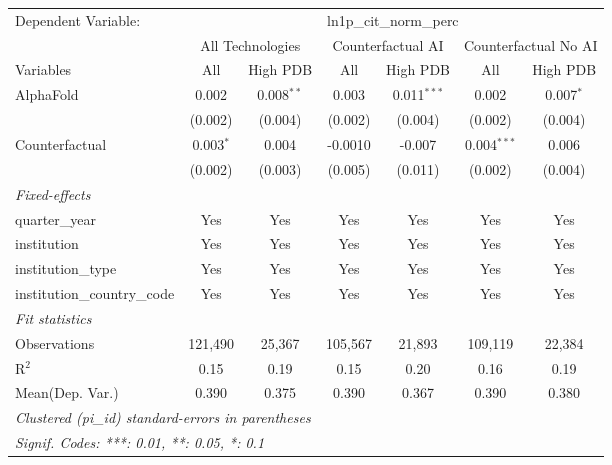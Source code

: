 \begingroup
\centering
\begin{tabular}{lcccccc}
   \tabularnewline \midrule \midrule
   Dependent Variable: & \multicolumn{6}{c}{ln1p\_cit\_norm\_perc}\\
 & \multicolumn{2}{c}{All Technologies} & \multicolumn{2}{c}{Counterfactual AI} & \multicolumn{2}{c}{Counterfactual No AI} \\
\cmidrule(lr){1-1}\cmidrule(lr){2-3} \cmidrule(lr){4-5} \cmidrule(lr){6-7}
Variables & \multicolumn{1}{c}{All} & \multicolumn{1}{c}{High PDB} & \multicolumn{1}{c}{All} & \multicolumn{1}{c}{High PDB} & \multicolumn{1}{c}{All} & \multicolumn{1}{c}{High PDB} \\
\cmidrule(lr){1-1}\cmidrule(lr){2-2} \cmidrule(lr){3-3} \cmidrule(lr){4-4} \cmidrule(lr){5-5} \cmidrule(lr){6-6} \cmidrule(lr){7-7}
   AlphaFold                    & 0.002       & 0.008$^{**}$ & 0.003   & 0.011$^{***}$ & 0.002         & 0.007$^{*}$\\   
                                & (0.002)     & (0.004)      & (0.002) & (0.004)       & (0.002)       & (0.004)\\   
   Counterfactual               & 0.003$^{*}$ & 0.004        & -0.0010 & -0.007        & 0.004$^{***}$ & 0.006\\   
                                & (0.002)     & (0.003)      & (0.005) & (0.011)       & (0.002)       & (0.004)\\   
   \midrule
   \emph{Fixed-effects}\\
   quarter\_year                & Yes         & Yes          & Yes     & Yes           & Yes           & Yes\\  
   institution                  & Yes         & Yes          & Yes     & Yes           & Yes           & Yes\\  
   institution\_type            & Yes         & Yes          & Yes     & Yes           & Yes           & Yes\\  
   institution\_country\_code   & Yes         & Yes          & Yes     & Yes           & Yes           & Yes\\  
   \midrule
   \emph{Fit statistics}\\
   Observations                 & 121,490     & 25,367       & 105,567 & 21,893        & 109,119       & 22,384\\  
   R$^2$                        & 0.15        & 0.19         & 0.15    & 0.20          & 0.16          & 0.19\\  
Mean(Dep. Var.) & 0.390 & 0.375 & 0.390 & 0.367 & 0.390 & 0.380 \\
   \midrule \midrule
   \multicolumn{7}{l}{\emph{Clustered (pi\_id) standard-errors in parentheses}}\\
   \multicolumn{7}{l}{\emph{Signif. Codes: ***: 0.01, **: 0.05, *: 0.1}}\\
\end{tabular}
\par\endgroup
